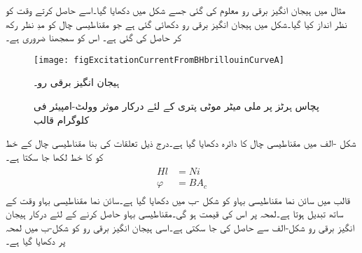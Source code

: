 مثال  میں ہیجان انگیز برقی رو معلوم کی گئی جسے شکل  میں دکھایا گیا۔اسے حاصل کرتے وقت  کو نظر انداز کیا گیا۔شکل  میں ہیجان انگیز برقی رو  دکھائی گئی ہے جو مقناطیسی چال کو مدِ نظر رکھ کر حاصل کی گئی ہے۔ اس کو سمجھنا ضروری ہے۔
\begin{figure}
\centering
\texttt{[image: figExcitationCurrentFromBHbrillouinCurveA]}
\caption{ہیجان انگیز برقی رو۔}
\label{شکل_مقناطیسی_ادوار_ہیجان_رو_بشمول_اثر_چال}
\end{figure}
%
\begin{figure}
%
\caption{پچاس ہرٹز پر  ملی میٹر موٹی پتری کے لئے درکار موثر وولٹ-امپیئر فی کلوگرام قالب}
\label{شکل_مقناطیسی_دور_درکار_ہیجان_وولٹ_ایمپیئر}
\end{figure}

شکل -الف میں  مقناطیسی چال کا دائرہ دکھایا گیا  ہے۔درج ذیل تعلقات کی بنا مقناطیسی چال کے  خط کو  کا خط لکھا جا سکتا ہے۔
\begin{gather}
\begin{aligned}
H l& =N i\\
\varphi&=B A_c
\end{aligned}
\end{gather}
قالب میں سائن نما مقناطیسی بہاو   کو شکل -ب  میں دکھایا گیا ہے۔سائن نما مقناطیسی بہاو وقت کے ساتھ تبدیل ہوتا ہے۔لمحہ  پر اس کی قیمت   ہو گی۔مقناطیسی بہاو  حاصل کرنے کے لئے درکار ہیجان انگیز برقی رو  شکل-الف سے حاصل کی جا سکتی ہے۔اسی  ہیجان انگیز برقی رو کو شکل-ب میں  لمحہ  پر دکھایا گیا ہے۔

